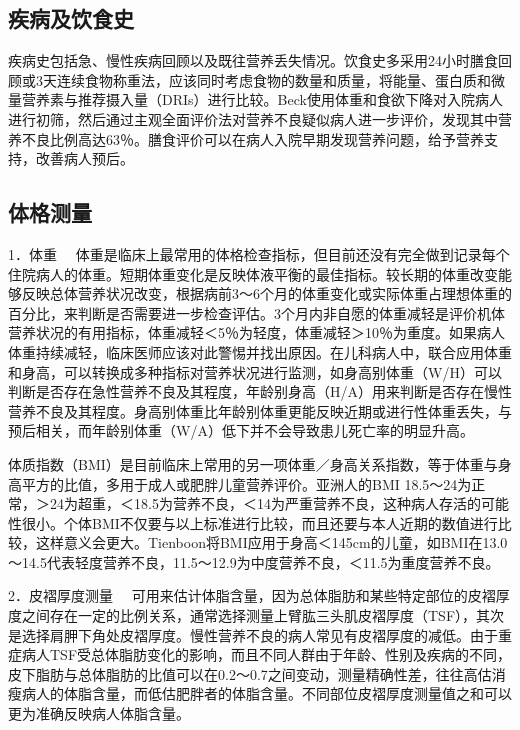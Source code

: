 \hypertarget{text00002.htmlux5cux23mllj5}{%
\subsection{疾病及饮食史}\label{text00002.htmlux5cux23mllj5}}

疾病史包括急、慢性疾病回顾以及既往营养丢失情况。饮食史多采用24小时膳食回顾或3天连续食物称重法，应该同时考虑食物的数量和质量，将能量、蛋白质和微量营养素与推荐摄入量（DRIs）进行比较。Beck使用体重和食欲下降对入院病人进行初筛，然后通过主观全面评价法对营养不良疑似病人进一步评价，发现其中营养不良比例高达63％。膳食评价可以在病人入院早期发现营养问题，给予营养支持，改善病人预后。

\hypertarget{text00002.htmlux5cux23mllj6}{%
\subsection{体格测量}\label{text00002.htmlux5cux23mllj6}}

{1．体重}
　体重是临床上最常用的体格检查指标，但目前还没有完全做到记录每个住院病人的体重。短期体重变化是反映体液平衡的最佳指标。较长期的体重改变能够反映总体营养状况改变，根据病前3～6个月的体重变化或实际体重占理想体重的百分比，来判断是否需要进一步检查评估。3个月内非自愿的体重减轻是评价机体营养状况的有用指标，体重减轻＜5％为轻度，体重减轻＞10％为重度。如果病人体重持续减轻，临床医师应该对此警惕并找出原因。在儿科病人中，联合应用体重和身高，可以转换成多种指标对营养状况进行监测，如身高别体重（W/H）可以判断是否存在急性营养不良及其程度，年龄别身高（H/A）用来判断是否存在慢性营养不良及其程度。身高别体重比年龄别体重更能反映近期或进行性体重丢失，与预后相关，而年龄别体重（W/A）低下并不会导致患儿死亡率的明显升高。

体质指数（BMI）是目前临床上常用的另一项体重／身高关系指数，等于体重与身高平方的比值，多用于成人或肥胖儿童营养评价。亚洲人的BMI
18.5～24为正常，＞24为超重，＜18.5为营养不良，＜14为严重营养不良，这种病人存活的可能性很小。个体BMI不仅要与以上标准进行比较，而且还要与本人近期的数值进行比较，这样意义会更大。Tienboon将BMI应用于身高＜145cm的儿童，如BMI在13.0～14.5代表轻度营养不良，11.5～12.9为中度营养不良，＜11.5为重度营养不良。

{2．皮褶厚度测量}
　可用来估计体脂含量，因为总体脂肪和某些特定部位的皮褶厚度之间存在一定的比例关系，通常选择测量上臂肱三头肌皮褶厚度（TSF），其次是选择肩胛下角处皮褶厚度。慢性营养不良的病人常见有皮褶厚度的减低。由于重症病人TSF受总体脂肪变化的影响，而且不同人群由于年龄、性别及疾病的不同，皮下脂肪与总体脂肪的比值可以在0.2～0.7之间变动，测量精确性差，往往高估消瘦病人的体脂含量，而低估肥胖者的体脂含量。不同部位皮褶厚度测量值之和可以更为准确反映病人体脂含量。

